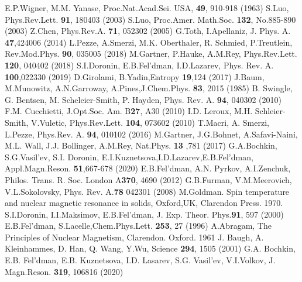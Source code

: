 \documentclass[preprint,12pt]{elsarticle}
\begin{document}
\begin{thebibliography}{20}
	 E.P.Wigner, M.M. Yanase, Proc.Nat.Acad.Sei. USA, \textbf{49}, 910-918 (1963)
	 S.Luo, Phys.Rev.Lett. \textbf{91}, 180403 (2003)
   S.Luo, Proc.Amer. Math.Soc. \textbf{132}, No.885-890 (2003)
	 Z.Chen, Phys.Rev.A. \textbf{71}, 052302 (2005)
   G.Toth, I.Apellaniz, J. Phys. A. \textbf{47},424006 (2014)
   L.Pezze, A.Smerzi, M.K. Oberthaler, R. Schmied, P.Treutlein, Rev.Mod.Phys. \textbf{90}, 035005 (2018)
   M.Gartner, P.Hauke, A.M.Rey, Phys.Rev.Lett. \textbf{120}, 040402 (2018)
   S.I.Doronin, E.B.Fel'dman, I.D.Lazarev, Phys. Rev. A. \textbf{100},022330 (2019)
   D.Girolami, B.Yadin,Entropy \textbf{19},124 (2017)
   J.Baum, M.Munowitz, A.N.Garroway, A.Pines,J.Chem.Phys. \textbf{83}, 2015 (1985)
   B. Swingle, G. Bentsen, M. Scheleier-Smith, P. Hayden, Phys.	Rev. A. \textbf{94}, 040302 (2010)
   F.M. Cucchietti, J.Opt.Soc. Am. B\textbf{27}, A30 (2010)
   I.D. Leroux, M.H. Schleier-Smith, V.Vuletic, Phys.Rev.Lett. \textbf{104}, 073602 (2010)
   T.Macri, A. Smerzi, L.Pezze, Phys.Rev. A. \textbf{94}, 010102 (2016)
   M.Gartner, J.G.Bohnet, A.Safavi-Naini, M.L. Wall, J.J. Bollinger, A.M.Rey, Nat.Phys. \textbf{13} ,781 (2017)
   G.A.Bochkin, S.G.Vasil'ev, S.I. Doronin, E.I.Kuznetsova,I.D.Lazarev,E.B.Fel'dman, Appl.Magn.Reson. \textbf{51},667-678 (2020)
   E.B.Fel'dman, A.N. Pyrkov, A.I.Zenchuk, Philos. Trans. R. Soc. London A\textbf{370}, 4690 (2012)
   G.B.Furman, V.M.Meerovich, V.L.Sokolovsky, Phys. Rev. A.\textbf{78} 042301 (2008)
   M.Goldman. Spin temperature and nuclear magnetic resonance in solids, Oxford,UK, Clarendon Press. 1970.
   S.I.Doronin, I.I.Maksimov, E.B.Fel’dman, J. Exp. Theor. Phys.\textbf{91}, 597 (2000)
   E.B.Fel'dman, S.Lacelle,Chem.Phys.Lett. \textbf{253}, 27 (1996)
   A.Abragam, The Principles of Nuclear Magnetism, Clarendon. Oxford. 1961
   J. Baugh, A. Kleinhammes, D. Han, Q. Wang, Y.Wu, Science \textbf{294}, 1505 (2001)
   G.A. Bochkin, E.B. Fel'dman, E.B. Kuznetsova, I.D. Lasarev, S.G. Vasil'ev, V.I.Volkov, J. Magn.Reson. \textbf{319}, 106816 (2020)
\end{thebibliography}
\end{document}

